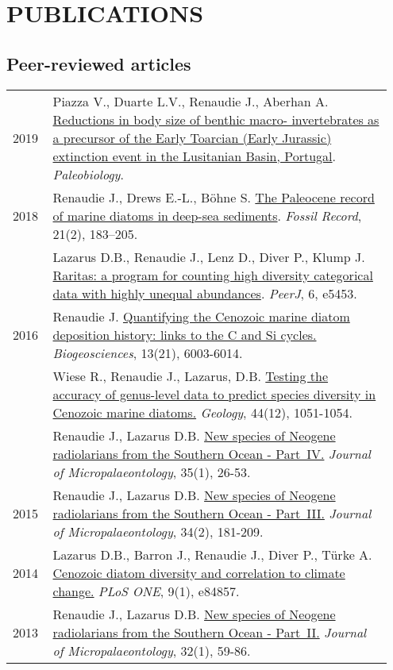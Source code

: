 \documentclass[11pt, a4paper]{article}
\begin{document}
\section{PUBLICATIONS}
\subsection{Peer-reviewed articles}
\begin{longtable}{p{0.1\linewidth} P{0.85\linewidth}}
2019 & Piazza V., Duarte L.V., Renaudie J., Aberhan A. \href{http://doi.org/10.1017/pab.2019.11}{Reductions in body size of benthic macro- invertebrates as a precursor of the Early Toarcian (Early Jurassic) extinction event in the Lusitanian Basin, Portugal}. \textit{Paleobiology}.\\
2018 & Renaudie J., Drews E.-L., B\"{o}hne S. \href{http://dx.doi.org/10.5194/fr-21-183-2018}{The Paleocene record of marine diatoms in deep-sea sediments}. \textit{Fossil Record}, 21(2), 183--205.\\
& Lazarus D.B., Renaudie J., Lenz D., Diver P., Klump J. \href{http://dx.doi.org/10.7717/peerj.5453}{Raritas: a program for counting high diversity categorical data with highly unequal abundances}. \textit{PeerJ}, 6, e5453.\\
2016 & Renaudie J. \href{http://dx.doi.org/10.5194/bg-13-6003-2016}{Quantifying the Cenozoic marine diatom deposition history: links to the C and Si cycles.} \textit{Biogeosciences}, 13(21), 6003-6014.\\
 & Wiese R., Renaudie J., Lazarus, D.B. \href{http://dx.doi.org/10.1130/G38347.1}{Testing the accuracy of genus-level data to predict species diversity in Cenozoic marine diatoms.} \textit{Geology}, 44(12), 1051-1054.\\
 & Renaudie J., Lazarus D.B. \href{http://dx.doi.org/10.1144/jmpaleo2014-026}{New species of Neogene radiolarians from the Southern Ocean - Part IV.} \textit{Journal of Micropalaeontology}, 35(1), 26-53.\\
2015 & Renaudie J., Lazarus D.B. \href{http://dx.doi.org/10.1144/jmpaleo2013-034}{New species of Neogene radiolarians from the Southern Ocean - Part III.} \textit{Journal of Micropalaeontology}, 34(2), 181-209.\\
2014 & Lazarus D.B., Barron J., Renaudie J., Diver P., Türke A. \href{http://dx.doi.org/10.1371/journal.pone.0084857}{Cenozoic diatom diversity and correlation to climate change.} \textit{PLoS ONE}, 9(1), e84857.\\
2013 & Renaudie J., Lazarus D.B. \href{http://dx.doi.org/10.1144/jmpaleo2011-025}{New species of Neogene radiolarians from the Southern Ocean - Part II.} \textit{Journal of Micropalaeontology}, 32(1), 59-86.\\

\end{longtable}
\end{document}
